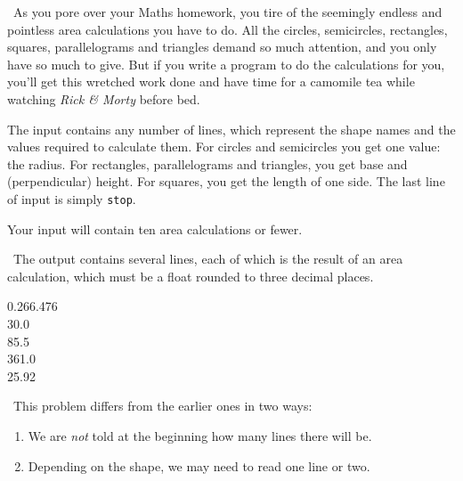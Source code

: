 
\Question\ As you pore over your Maths homework, you tire of the seemingly endless and
pointless area calculations you have to do. All the circles, semicircles, rectangles,
squares, parallelograms and triangles demand so much attention, and you only have so much
to give. But if you write a program to do the calculations for you, you'll get this
wretched work done and have time for a camomile tea while watching \emph{Rick \& Morty}
before bed.

\Input

The input contains any number of lines, which represent the shape names and the values
required to calculate them. For circles and semicircles you get one value: the radius. For
rectangles, parallelograms and triangles, you get base and (perpendicular) height. For
squares, you get the length of one side. The last line of input is simply \texttt{stop}.

Your input will contain ten area calculations or fewer.

\Output\ The output contains several lines, each of which is the result of an area
calculation, which must be a float rounded to three decimal places.

\Sample

       {0.2}{66.476\\30.0\\85.5\\361.0\\25.92}

\Scratch\ This problem differs from the earlier ones in two ways:
\begin{enumerate}
  \item We are \emph{not} told at the beginning how many lines there will be.
  \item Depending on the shape, we may need to read one line or two.
\end{enumerate}

